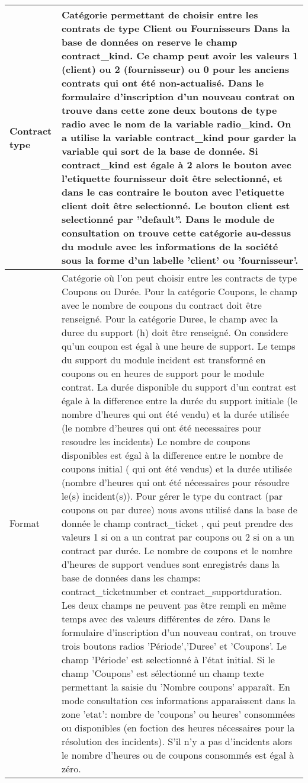 \begin{tabular}{|p{3cm}|p{10cm}|}
Contract type & Catégorie permettant de choisir entre les contrats de type Client ou Fournisseurs 
Dans la base de données on reserve le champ contract\_kind. Ce champ peut avoir les valeurs
1 (client) ou 2 (fournisseur) ou 0 pour les anciens contrats qui ont été non-actualisé.
Dans le formulaire d'inscription d'un nouveau contrat on trouve dans cette zone deux boutons de type radio
avec le nom de la variable radio\_kind. On a utilise la variable contract\_kind pour garder la variable qui sort de la base de donnée. Si contract\_kind est égale à 2 alors le bouton avec l'etiquette fournisseur doit être selectionné, et dans le cas contraire le bouton avec l'etiquette client doit être selectionné. Le bouton client est selectionné  par ''default''.
Dans le module de consultation on trouve cette catégorie au-dessus du module avec les informations de la société sous la forme d'un labelle 'client' ou 'fournisseur'.
\\
\hline
Format & Catégorie où l'on peut choisir entre les contracts de type Coupons ou Durée.
 Pour la catégorie Coupons, le champ avec le nombre de coupons du contract doit être renseigné.
 Pour la catégorie Duree, le champ avec la duree du support (h) doit être renseigné.
On considere qu'un coupon est égal à une heure de support. Le temps du support du module incident est transformé
 en coupons ou en heures de support pour le module contrat.
La durée disponible du support d'un contrat est égale à la difference entre la durée du support initiale (le nombre 
 d'heures qui ont été vendu) et la durée utilisée (le nombre d'heures qui ont été necessaires pour resoudre les incidents)
Le nombre de coupons disponibles est égal à la difference entre le nombre de coupons initial ( qui ont été vendus) et la durée utilisée (nombre d'heures qui ont été nécessaires pour résoudre le(s) incident(s)).
Pour gérer le type du contract (par coupons ou par duree) nous avons utilisé dans la base de donnée le champ
contract\_ticket , qui peut prendre des valeurs 1 si on a un contrat par coupons ou 2  si on a un contract par durée.
Le nombre de coupons et le nombre d'heures de support vendues sont enregistrés dans la base de données dans les champs:
contract\_ticketnumber et contract\_supportduration.
Les deux champs ne peuvent pas être rempli en même temps avec des valeurs différentes de zéro.
Dans le formulaire d'inscription d'un nouveau contrat, on trouve trois boutons radios 'Période','Duree' et 'Coupons'. Le champ 'Période' est selectionné à l'état initial.
Si le champ 'Coupons' est sélectionné un champ texte permettant la saisie du 'Nombre coupons' apparaît.
En mode consultation ces informations apparaissent dans la zone 'etat': nombre de 'coupons' ou heures' consommées ou disponibles (en foction des heures nécessaires pour la résolution des incidents).
S'il n'y a pas d'incidents alors le nombre d'heures ou de coupons consommés est égal à zéro.

\\
\hline
\end{tabular}
